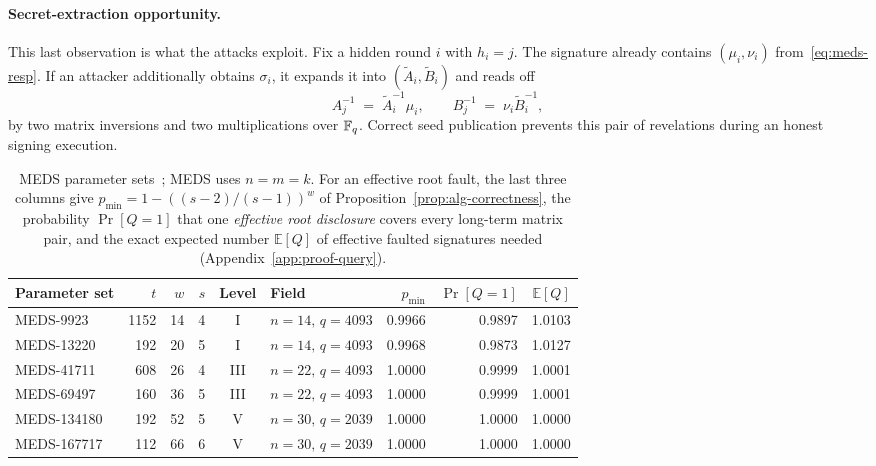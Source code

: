 \paragraph{Secret-extraction opportunity.}
This last observation is what the attacks exploit. Fix a hidden round $i$ with
$h_i = j$. The signature already contains $(\mu_i,\nu_i)$
from~\eqref{eq:meds-resp}. If an attacker additionally obtains $\sigma_i$, it
expands it into $(\tilde{A}_i,\tilde{B}_i)$ and reads off
\begin{equation}
  \label{eq:meds-extract}
  A_j^{-1} \;=\; \tilde{A}_i^{-1} \mu_i,
  \qquad
  B_j^{-1} \;=\; \nu_i \tilde{B}_i^{-1},
\end{equation}
by two matrix inversions and two multiplications over $\mathbb{F}_q$. Correct seed publication prevents this pair of revelations during
an honest signing execution.

\begin{table}[htbp]
\centering
\caption{MEDS parameter sets~\cite{ChouNPRRST23}; MEDS uses $n{=}m{=}k$. For
an effective root fault, the last three columns give
$p_{\min} = 1-((s-2)/(s-1))^{w}$ of Proposition~\ref{prop:alg-correctness},
the probability $\Pr[Q{=}1]$ that one \emph{effective root disclosure}
covers every long-term matrix pair, and the exact expected number $\mathbb{E}[Q]$ of effective faulted
signatures needed (Appendix~\ref{app:proof-query}).}
\label{tab:scheme-params}
\setlength{\tabcolsep}{4pt}
\small
\begin{tabular}{@{}lrrrcl rrr@{}}
\toprule
\textbf{Parameter set} & $t$ & $w$ & $s$ & \textbf{Level} & \textbf{Field}
 & $p_{\min}$ & $\Pr[Q{=}1]$ & $\mathbb{E}[Q]$ \\
\midrule
MEDS-9923   & 1152 & 14 & 4 & I   & $n{=}14,\,q{=}4093$ & 0.9966 & 0.9897 & 1.0103 \\
MEDS-13220  &  192 & 20 & 5 & I   & $n{=}14,\,q{=}4093$ & 0.9968 & 0.9873 & 1.0127 \\
MEDS-41711  &  608 & 26 & 4 & III & $n{=}22,\,q{=}4093$ & 1.0000 & 0.9999 & 1.0001 \\
MEDS-69497  &  160 & 36 & 5 & III & $n{=}22,\,q{=}4093$ & 1.0000 & 0.9999 & 1.0001 \\
MEDS-134180 &  192 & 52 & 5 & V   & $n{=}30,\,q{=}2039$ & 1.0000 & 1.0000 & 1.0000 \\
MEDS-167717 &  112 & 66 & 6 & V   & $n{=}30,\,q{=}2039$ & 1.0000 & 1.0000 & 1.0000 \\
\bottomrule
\end{tabular}
\end{table}

